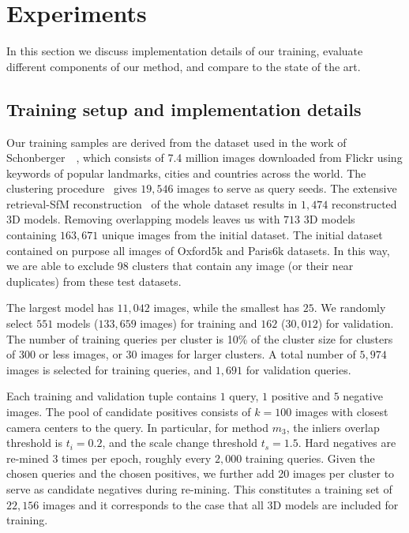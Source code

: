 \section{Experiments}
%
\vspace{-5pt}
In this section we discuss implementation details of our training, evaluate different components of our method, and compare to the state of the art. 

\vspace{-5pt}
\subsection{Training setup and implementation details}
%
Our training samples are derived from the dataset used in the work of Schonberger~\etal~\cite{SRCF15}, which consists of 7.4 million images downloaded from Flickr using keywords of popular landmarks, cities and countries across the world.
The clustering procedure~\cite{CM10a} gives $19,546$ images to serve as query seeds. 
The extensive retrieval-SfM reconstruction~\cite{RSJFCM16} of the whole dataset results in $1,474$ reconstructed 3D models. 
Removing overlapping models leaves us with $713$ 3D models containing $163,671$ unique images from the initial dataset.
The initial dataset contained on purpose all images of Oxford5k and Paris6k datasets. 
In this way, we are able to exclude 98 clusters that contain any image (or their near duplicates) from these test datasets.

The largest model has $11,042$ images, while the smallest has $25$.
We randomly select $551$ models ($133,659$ images) for training and $162$ ($30,012$) for validation. 
The number of training queries per cluster is 10\% of the cluster size for clusters of 300 or less images, or 30 images for larger clusters. A total number of $5,974$ images is selected for training queries, and $1,691$ for validation queries.

Each training and validation tuple contains $1$ query, $1$ positive and $5$ negative images.
The pool of candidate positives consists of $k=100$ images with closest camera centers to the query.
In particular, for method $m_3$, the inliers overlap threshold is $t_i=0.2$, and the scale change threshold $t_s=1.5$.
Hard negatives are re-mined $3$ times per epoch, \ie roughly every $2,000$ training queries. 
Given the chosen queries and the chosen positives, we further add 20 images per cluster to serve as candidate negatives during re-mining.
This constitutes a training set of $22,156$ images and it corresponds to the case that all 3D models are included for training.

